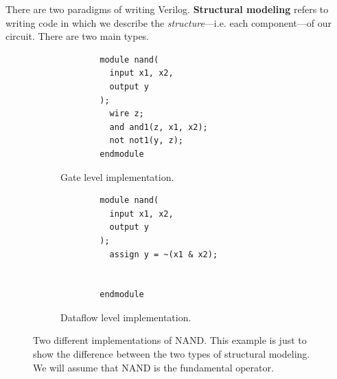   There are two paradigms of writing Verilog. \textbf{Structural modeling} refers to writing code in which we describe the \textit{structure}---i.e. each component---of our circuit. There are two main types. 

  \begin{figure}[H]
    \centering
    \begin{subfigure}[b]{0.48\textwidth}
      \centering
      \begin{lstlisting}
        module nand(
          input x1, x2,
          output y
        );
          wire z; 
          and and1(z, x1, x2); 
          not not1(y, z);
        endmodule
      \end{lstlisting}
      \caption{Gate level implementation.}
    \end{subfigure}
    \hfill 
    \begin{subfigure}[b]{0.48\textwidth}
      \centering
      \begin{lstlisting}
        module nand(
          input x1, x2,
          output y
        );
          assign y = ~(x1 & x2);


        endmodule
      \end{lstlisting}
      \caption{Dataflow level implementation.}
    \end{subfigure}
    \caption{Two different implementations of NAND. This example is just to show the difference between the two types of structural modeling. We will assume that NAND is the fundamental operator. }
  \end{figure}

